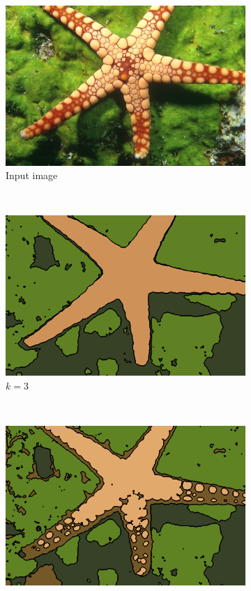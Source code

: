 \documentclass[journal]{IEEEtran}
\begin{document}
\begin{figure}[!t]
    
    \begin{subfigure}[b]{0.18\textwidth}
    	\centering
        \includegraphics[width=\textwidth]{12003}
        \caption{Input image}
    \end{subfigure} ~    
    \begin{subfigure}[b]{0.18\textwidth}
    	\centering
    	\includegraphics[width=\textwidth]{12003_GaussianMixture_3_segm}
        \caption{$k=3$ }
    \end{subfigure} ~
    \begin{subfigure}[b]{0.18\textwidth}
    	\centering
        \includegraphics[width=\textwidth]{12003_GaussianMixture_4_segm}

\end{subfigure}
\end{figure}
\end{document}
